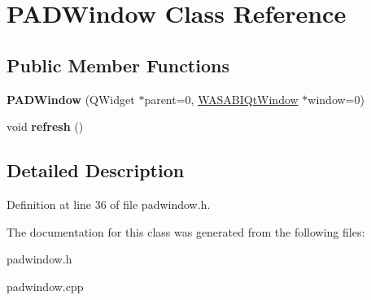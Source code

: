 \hypertarget{class_p_a_d_window}{
\section{\-P\-A\-D\-Window \-Class \-Reference}
\label{class_p_a_d_window}
}
\subsection*{\-Public \-Member \-Functions}
\begin{DoxyCompactItemize}
\item 
\hypertarget{class_p_a_d_window_ad88255e04127a1cedb93bbf4d5093b64}{
{\bfseries \-P\-A\-D\-Window} (\-Q\-Widget $\ast$parent=0, \hyperlink{class_w_a_s_a_b_i_qt_window}{\-W\-A\-S\-A\-B\-I\-Qt\-Window} $\ast$window=0)}
\label{class_p_a_d_window_ad88255e04127a1cedb93bbf4d5093b64}

\item 
\hypertarget{class_p_a_d_window_a156d8059ed6f45daa56c60dceaf1cfe4}{
void {\bfseries refresh} ()}
\label{class_p_a_d_window_a156d8059ed6f45daa56c60dceaf1cfe4}

\end{DoxyCompactItemize}


\subsection{\-Detailed \-Description}


\-Definition at line 36 of file padwindow.\-h.



\-The documentation for this class was generated from the following files\-:\begin{DoxyCompactItemize}
\item 
padwindow.\-h\item 
padwindow.\-cpp\end{DoxyCompactItemize}
